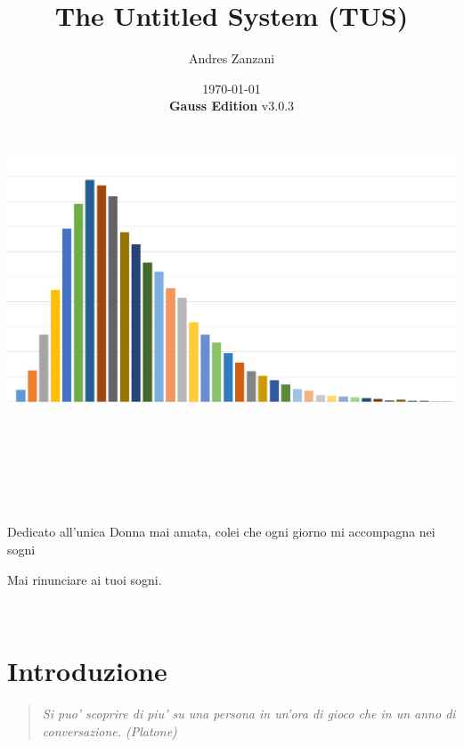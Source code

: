 \documentclass[a4paper,11pt,twoside,openany]{book}
\begin{document}
	
	\title{The Untitled System (TUS)}
	\date{\today\\\textbf{Gauss Edition} v3.0.3\\\includegraphics[width=6.85139in,height=3.79514in]{copertina.png}}
	\author{Andres Zanzani}
	\maketitle
	\thispagestyle{empty}
	
	\newpage~\newpage~
	
	
	
	
	Dedicato all'unica Donna mai amata, colei che ogni giorno mi accompagna nei sogni
	
	Mai rinunciare ai tuoi sogni.
	\thispagestyle{empty}
	
	\newpage~\thispagestyle{empty}%
	
	\setcounter{page}{0}
	
	\begin{multicols}{2}
		\tableofcontents{}
	\end{multicols}
	
	\pagebreak{}
	
	\section{Introduzione}
	
	\pagestyle{plain} 
	\begin{quote}\textit{Si puo' scoprire di piu' su una persona in un'ora di gioco che in un anno di conversazione. (Platone)
	}\end{quote}
	
\end{document}
